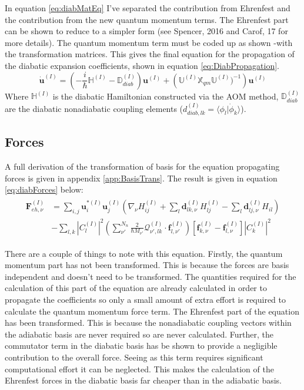 \noindent In equation \eqref{eq:diabMatEq} I've separated the contribution from Ehrenfest and the contribution from the new quantum momentum terms. The Ehrenfest part can be shown to reduce to a simpler form (see Spencer, 2016 \cite{spencer_fob-sh:_2016} and Carof, 17 \cite{carof_detailed_2017} for more details). The quantum momentum term must be coded up as shown -with the transformation matrices. This gives the final equation for the propagation of the diabatic expansion coefficients, shown in equation \eqref{eq:DiabPropagation}.
\begin{equation}
  \dot{\mathbf{u}}^{(I)} = \left(-\frac{i}{\hbar} \mathbb{H}^{(I)} - \mathbb{D}^{(I)}_{diab} \right) \mathbf{u}^{(I)} + \left(\mathbb{U}^{(I)} \mathbb{X}_{qm} \mathbb{U}^{(I)})^{-1} \right) \mathbf{u}^{(I)}
  \label{eq:DiabPropagation}
\end{equation}
Where $\mathbb{H}^{(I)}$ is the diabatic Hamiltonian constructed via the AOM method, $\mathbb{D}_{diab}^{(I)}$ are the diabatic nonadiabatic coupling elements ($d_{diab, lk}^{(I)} = \langle \phi_{l} | \dot{\phi}_{k} \rangle$).

\subsection{Forces}
A full derivation of the transformation of basis for the equation propagating forces is given in appendix \ref{app:BasisTrans}. The result is given in equation \eqref{eq:diabForces} below:
\begin{align}
  \begin{split}
	  \mathbf{F}_{eh, \nu}^{(I)} &= \sum_{i,j} \mathbf{u}_{i}^{*(I)} \mathbf{u}_{j}^{(I)} \left( \nabla_{\nu} H_{ij}^{(I)} + \sum_{l} \mathbf{d}_{lk, \nu}^{(I)} H_{lj}^{(I)} - \sum_{l} \mathbf{d}_{lj, \nu}^{(I)} H_{il} \right) \\
	  &- \sum_{l,k} |C_{l}^{(I)}|^2 \left( \sum_{\nu'}^{N_{n}}                \frac{2}{\hbar M_{\nu'}} \mathcal{Q}_{\nu', lk}^{(I)} \cdot                   \mathbf{f}_{l, \nu'}^{(I)} \right)\left[ \mathbf{f}_{k, \nu}^{(I)} -          \mathbf{f}_{l, \nu}^{(I)} \right] |C_{k}^{(I)}|^2
	\end{split}
  \label{eq:diabForces}
\end{align}

\noindent There are a couple of things to note with this equation. Firstly, the quantum momentum part has not been transformed. This is because the forces are basis independent and doesn't need to be transformed. The quantities required for the calculation of this part of the equation are already calculated in order to propagate the coefficients so only a small amount of extra effort is required to calculate the quantum momentum force term. The Ehrenfest part of the equation has been transformed. This is because the nonadiabatic coupling vectors within the adiabatic basis are never required so are never calculated. Further, the commutator term in the diabatic basis has be shown to provide a negligible contribution to the overall force. Seeing as this term requires significant computational effort it can be neglected. This makes the calculation of the Ehrenfest forces in the diabatic basis far cheaper than in the adiabatic basis.

